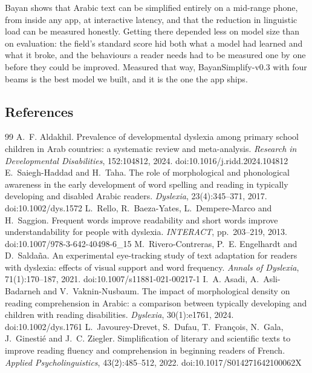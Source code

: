 \documentclass[10pt,a4paper]{article}
\newcommand{\vThree}{BayanSimplify-v0.3}
\begin{document}
 Bayan shows that Arabic text can be simplified entirely on a
mid-range phone, from inside any app, at interactive latency, and that the
reduction in linguistic load can be measured honestly. Getting there depended less
on model size than on evaluation: the field's standard score hid both what a model
had learned and what it broke, and the behaviours a reader needs had to be measured
one by one before they could be improved. Measured that way, \vThree{} with four
beams is the best model we built, and it is the one the app ships.

\FloatBarrier
\subsection*{References}
\begin{thebibliography}{99}
\small
\setlength{\itemsep}{1pt}
 A.~F. Aldakhil. Prevalence of developmental dyslexia among primary school children in Arab countries: a systematic review and meta-analysis. \emph{Research in Developmental Disabilities}, 152:104812, 2024. doi:10.1016/j.ridd.2024.104812
 E.~Saiegh-Haddad and H.~Taha. The role of morphological and phonological awareness in the early development of word spelling and reading in typically developing and disabled Arabic readers. \emph{Dyslexia}, 23(4):345--371, 2017. doi:10.1002/dys.1572
 L.~Rello, R.~Baeza-Yates, L.~Dempere-Marco and H.~Saggion. Frequent words improve readability and short words improve understandability for people with dyslexia. \emph{INTERACT}, pp.~203--219, 2013. doi:10.1007/978-3-642-40498-6\_15
 M.~Rivero-Contreras, P.~E. Engelhardt and D.~Saldaña. An experimental eye-tracking study of text adaptation for readers with dyslexia: effects of visual support and word frequency. \emph{Annals of Dyslexia}, 71(1):170--187, 2021. doi:10.1007/s11881-021-00217-1
 I.~A. Asadi, A.~Asli-Badarneh and V.~Vaknin-Nusbaum. The impact of morphological density on reading comprehension in Arabic: a comparison between typically developing and children with reading disabilities. \emph{Dyslexia}, 30(1):e1761, 2024. doi:10.1002/dys.1761
 L.~Javourey-Drevet, S.~Dufau, T.~François, N.~Gala, J.~Ginestié and J.~C. Ziegler. Simplification of literary and scientific texts to improve reading fluency and comprehension in beginning readers of French. \emph{Applied Psycholinguistics}, 43(2):485--512, 2022. doi:10.1017/S014271642100062X

\end{thebibliography}
\end{document}

